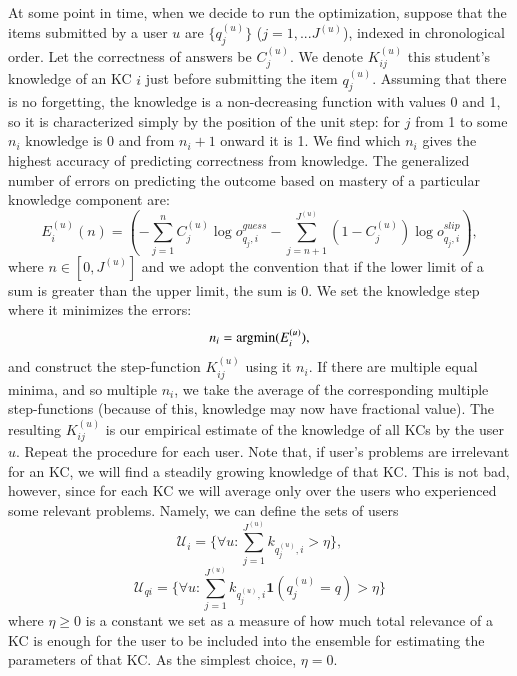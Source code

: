 \documentclass{sigchi}
\newcommand{\1}{\mathbf{1}}
\newcommand{\be}{\begin{equation}}
\newcommand{\ee}{\end{equation}}
\newcommand{\argmin}{\operatornamewithlimits{argmin}}
\begin{document}
At some point in time, when we decide to run the optimization, suppose that the items submitted by a user $u$ are $\{q^{(u)}_j\}$ ($j=1,...J^{(u)}$), indexed in chronological order. Let the correctness of answers be $C^{(u)}_{j}$. We denote $K^{(u)}_{ij}$ this student's knowledge of an KC $i$ just before submitting the item $q^{(u)}_j$. Assuming that there is no forgetting, the knowledge is a non-decreasing function with values 0 and 1, so it is characterized simply by the position of the unit step: for $j$ from 1 to some $n_i$ knowledge is 0 and from $n_i+1$ onward it is 1. We find which $n_i$ gives the highest accuracy of predicting correctness from knowledge. The generalized number of errors on predicting the outcome based on mastery of a particular knowledge component are:
\be E^{(u)}_i(n)=\left(-\sum_{j=1}^{n}C^{(u)}_j\log o^{guess}_{q_j,i} - \sum_{j=n+1}^{J^{(u)}}(1-C^{(u)}_j)\log o^{slip}_{q_j,i}\right),\ee
where $n\in[0,J^{(u)}]$ and we adopt the convention that if the lower limit of a sum is greater than the upper limit, the sum is 0. We set the knowledge step where it minimizes the errors:
\be n_i=\argmin(E^{(u)}_i),\ee
and construct the step-function $K^{(u)}_{ij}$ using it $n_i$. If there are multiple equal minima, and so multiple $n_i$, we take the average of the corresponding multiple step-functions (because of this, knowledge may now have fractional value). The resulting $K^{(u)}_{ij}$ is our empirical estimate of the knowledge of all KCs by the user $u$. Repeat the procedure for each user. Note that, if user's problems are irrelevant for an KC, we will find a steadily growing knowledge of that KC. This is not bad, however, since for each KC we will average only over the users who experienced some relevant problems. Namely, we can define the sets of users
\be
\mathcal{U}_i=\{\forall u: \sum_{j=1}^{J^{(u)}}k_{q_j^{(u)},i}>\eta\},
\ee
\be
\mathcal{U}_{qi}=\{\forall u: \sum_{j=1}^{J^{(u)}}k_{q_j^{(u)},i}\1(q^{(u)}_j=q)>\eta\}
\ee
where $\eta\geq 0$ is a constant we set as a measure of how much total relevance of a KC is enough for the user to be included into the ensemble for estimating the parameters of that KC. As the simplest choice, $\eta=0$.
\end{document}
